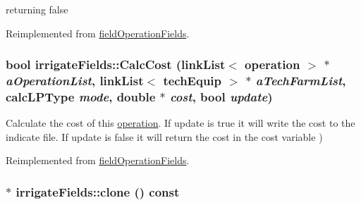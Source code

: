 returning false 

Reimplemented from \hyperlink{classfield_operation_fields_a46acdf3a83fd93634ecc8f97d44a2f81}{fieldOperationFields}.\hypertarget{classirrigate_fields_a2180e7648439e025e85c304388260f14}{
\subsubsection[{CalcCost}]{\setlength{\rightskip}{0pt plus 5cm}bool irrigateFields::CalcCost ({\bf linkList}$<$ {\bf operation} $>$ $\ast$ {\em aOperationList}, \/  {\bf linkList}$<$ {\bf techEquip} $>$ $\ast$ {\em aTechFarmList}, \/  {\bf calcLPType} {\em mode}, \/  double $\ast$ {\em cost}, \/  bool {\em update})}}
\label{classirrigate_fields_a2180e7648439e025e85c304388260f14}
Calculate the cost of this \hyperlink{classoperation}{operation}. If update is true it will write the cost to the indicate file. If update is false it will return the cost in the cost variable ) 

Reimplemented from \hyperlink{classfield_operation_fields_aeb2bce9d4612033dbab366d870e432a6}{fieldOperationFields}.\hypertarget{classirrigate_fields_a162b39c6de0effa998c14fa4516da08b}{
\subsubsection[{clone}]{ $\ast$ irrigateFields::clone () const}}
\label{classirrigate_fields_a162b39c6de0effa998c14fa4516da08b}


